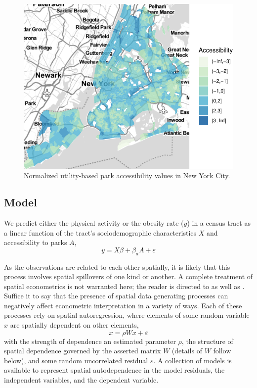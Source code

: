 \documentclass[Afour,sageh.bst]{sagej}
\begin{document}
\begin{figure}
\includegraphics{map-1} \caption{Normalized utility-based park accessibility values in New York City.}\label{fig:map}
\end{figure}

\hypertarget{model}{%
\subsection{Model}\label{model}}

\label{subsec:model}

We predict either the physical activity or the obesity rate (\(y\)) in a
census tract as a linear function of the tract's sociodemographic
characteristics \(X\) and accessibility to parks \(A\),
\begin{equation}\label{eq:themodel}
 y = X\beta + \beta_{a}A + \varepsilon
\end{equation}

As the observations are related to each other spatially, it is likely
that this process involves spatial spillovers of one kind or another. A
complete treatment of spatial econometrics is not warranted here; the
reader is directed to \citet{LeSage2009} as well as \citet{LeSage2014}.
Suffice it to say that the presence of spatial data generating processes
can negatively affect econometric interpretation in a variety of ways.
Each of these processes rely on spatial autoregression, where elements
of some random variable \(x\) are spatially dependent on other elements,
\begin{equation}\label{eq:autoregression}
 x = \rho W x + \varepsilon
\end{equation} with the strength of dependence an estimated parameter
\(\rho\), the structure of spatial dependence governed by the asserted
matrix \(W\) (details of \(W\) follow below), and some random
uncorrelated residual \(\varepsilon\). A collection of models is
available to represent spatial autodependence in the model residuals,
the independent variables, and the dependent variable.
\end{document}
